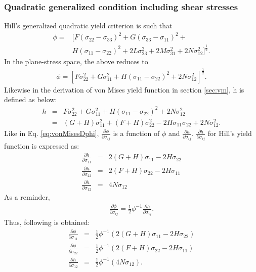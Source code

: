 \documentclass[12pt]{amsart}
\begin{document}
\subsubsection{Quadratic generalized condition including shear stresses}
Hill's generalized quadratic yield criterion is such that
\begin{equation}
  \label{eq:hillgenquad}
  \begin{aligned}
    \phi =& [F(\sigma_{22}-\sigma_{33})^2+G(\sigma_{33}-\sigma_{11})^2+\\
          &H(\sigma_{11}-\sigma_{22})^2+2L\sigma_{23}^2+2M\sigma_{31}^2+2N\sigma_{12}^2]^\frac{1}{2}.
  \end{aligned}
\end{equation}
In the plane-stress space, the above reduces to
\begin{equation}
  \label{eq:hillgenquad}
  \begin{aligned}
    \phi = [F\sigma_{22}^2+G\sigma_{11}^2+H(\sigma_{11}-\sigma_{22})^2+2N\sigma_{12}^2]^\frac{1}{2}.
  \end{aligned}
\end{equation}
Likewise in the derivation of von Mises yield function in section \ref{sec:vm}, h is defined as below:
\begin{eqnarray}
  \label{eq:hill48H}
  h&=&F\sigma_{22}^2+G\sigma_{11}^2+H(\sigma_{11}-\sigma_{22})^2+2N\sigma_{12}^2\\
   &=&(G+H)\sigma_{11}^2+(F+H)\sigma_{22}^2-2H\sigma_{11}\sigma_{22}+2N\sigma_{12}^2.
\end{eqnarray}
Like in Eq. \ref{eq:vonMisesDphi},  $\frac{\partial \phi}{\partial\sigma_{ij}}$ is a function of $\phi$ and $\frac{\partial h}{\partial \sigma_{ij}}$.
$\frac{\partial h}{\partial \sigma_{ij}}$ for Hill's yield function is expressed as:
\begin{eqnarray}
  \label{eq:h_Hill48}
  \frac{\partial h}{\partial \sigma_{11}}&=&2(G+H)\sigma_{11} -2H\sigma_{22}  \\
  \frac{\partial h}{\partial \sigma_{22}}&=&2(F+H)\sigma_{22} -2H\sigma_{11}   \\
  \frac{\partial h}{\partial \sigma_{12}}&=&4N\sigma_{12}
\end{eqnarray}
As a reminder,
\begin{eqnarray}
  \label{eq:vmdphi_gen}
  \frac{\partial \phi}{\partial\sigma_{ij}}=\frac{1}{2}\phi^{-1} \frac{\partial h}{\partial \sigma_{ij}}.
\end{eqnarray}
Thus, following is obtained:
\begin{eqnarray}
  \label{eq:vmdphi_components}
  \frac{\partial \phi}{\partial\sigma_{11}}&=&\frac{1}{2}\phi^{-1} (2(G+H)\sigma_{11} -2H\sigma_{22} )\\
  \frac{\partial \phi}{\partial\sigma_{22}}&=&\frac{1}{2}\phi^{-1} (2(F+H)\sigma_{22} -2H\sigma_{11} )\\
  \frac{\partial    h}{\partial\sigma_{12}}&=&\frac{1}{2}\phi^{-1} (4N\sigma_{12}).
\end{eqnarray}
\end{document}
